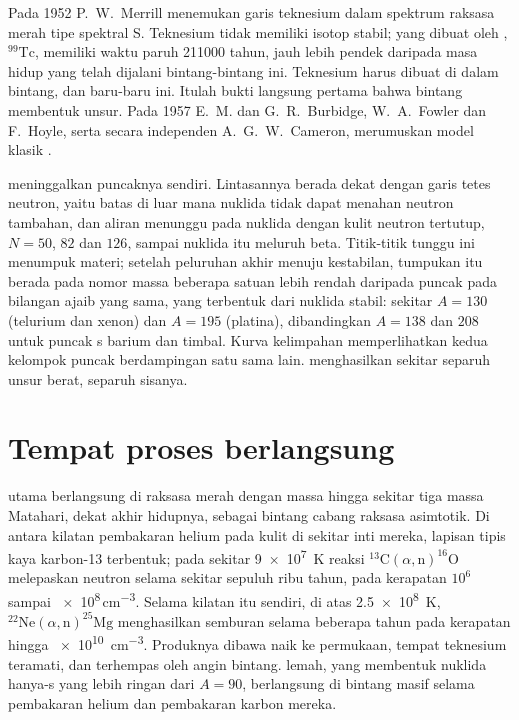 \begin{history}
Pada 1952 P.~W.~Merrill menemukan garis teknesium dalam spektrum
raksasa merah tipe spektral S. Teknesium tidak memiliki isotop stabil; yang
dibuat oleh , $^{99}\mathrm{Tc}$, memiliki waktu paruh
\num{211000} tahun, jauh lebih pendek daripada masa hidup yang
telah dijalani bintang-bintang ini. Teknesium harus dibuat di dalam bintang, dan
baru-baru ini. Itulah bukti langsung pertama bahwa bintang membentuk unsur.
Pada 1957 E.~M. dan G.~R.~Burbidge, W.~A.~Fowler dan F.~Hoyle, serta
secara independen A.~G.~W.~Cameron, merumuskan model klasik
.
\end{history}

 meninggalkan puncaknya sendiri. Lintasannya berada dekat dengan garis tetes neutron,
yaitu batas di luar mana nuklida tidak dapat menahan neutron tambahan,
dan aliran menunggu pada nuklida dengan kulit neutron tertutup, $N = 50$, $82$ dan
$126$, sampai nuklida itu meluruh beta. Titik-titik tunggu ini menumpuk materi;
setelah peluruhan akhir menuju kestabilan, tumpukan itu berada pada nomor massa beberapa
satuan lebih rendah daripada puncak  pada bilangan ajaib yang sama, yang
terbentuk dari nuklida stabil: sekitar $A = 130$ (telurium dan xenon) dan
$A = 195$ (platina), dibandingkan $A = 138$ dan $208$ untuk puncak s
barium dan timbal. Kurva kelimpahan memperlihatkan kedua kelompok puncak berdampingan
satu sama lain.  menghasilkan sekitar separuh unsur berat, 
separuh sisanya.

\section{Tempat proses berlangsung}\label{sec:b3:origin-of-elements:sites}

 utama berlangsung di raksasa merah dengan massa hingga sekitar tiga massa Matahari, dekat
akhir hidupnya, sebagai bintang cabang raksasa asimtotik. Di antara kilatan
pembakaran helium pada kulit di sekitar inti mereka, lapisan tipis kaya
karbon-13 terbentuk; pada sekitar \qty{9e7}{K} reaksi
$^{13}\mathrm{C}(\alpha,\mathrm{n})^{16}\mathrm{O}$ melepaskan neutron
selama sekitar sepuluh ribu tahun, pada kerapatan $10^6$ sampai
\num{e8}\,\unit{cm^{-3}}. Selama kilatan itu sendiri, di atas
\qty{2.5e8}{K}, $^{22}\mathrm{Ne}(\alpha,\mathrm{n})^{25}\mathrm{Mg}$
menghasilkan semburan selama beberapa tahun pada kerapatan hingga \qty{e10}{cm^{-3}}. Produknya
dibawa naik ke permukaan, tempat teknesium teramati, dan terhempas
oleh angin bintang.  lemah, yang membentuk nuklida hanya-s
yang lebih ringan dari $A = 90$, berlangsung di bintang masif selama pembakaran helium dan
pembakaran karbon mereka.

